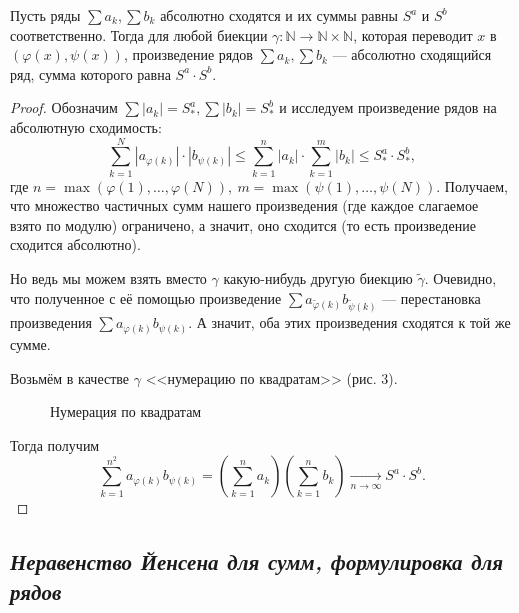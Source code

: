 \begin{theorem}
	Пусть ряды \(\sum a_k, \sum b_k\) абсолютно сходятся и их суммы равны \(S^a\) и \(S^b\) соответственно. Тогда для любой биекции \(\gamma \colon \mathbb{N} \to \mathbb{N} \times \mathbb{N}\), которая переводит \(x\) в \((\varphi(x), \psi(x))\), произведение рядов \(\sum a_k, \sum b_k\) --- абсолютно сходящийся ряд, сумма которого равна \(S^a \cdot S^b\).
\end{theorem}
\begin{proof}
	Обозначим \(\sum |a_k| = S_*^a, \sum |b_k| = S_*^b\) и исследуем произведение рядов на абсолютную сходимость: \[
	\sum_{k=1}^{N} |a_{\varphi(k)}| \cdot |b_{\psi(k)}| \leqslant \sum_{k=1}^{n} |a_k| \cdot \sum_{k=1}^{m} |b_k| \leqslant S_*^a \cdot S_*^b,
	\]
	где \(n = \max(\varphi(1), \ldots, \varphi(N)), \ m = \max(\psi(1), \ldots, \psi(N))\). Получаем, что множество частичных сумм нашего произведения (где каждое слагаемое взято по модулю) ограничено, а значит, оно сходится (то есть произведение сходится абсолютно).
	
	Но ведь мы можем взять вместо \(\gamma\) какую-нибудь другую биекцию \(\widetilde{\gamma}\). Очевидно, что полученное с её помощью произведение \(\sum a_{\widetilde{\varphi}(k)} b_{\widetilde{\psi}(k)}\) --- перестановка произведения \(\sum a_{\varphi(k)} b_{\psi(k)}\). А значит, оба этих произведения сходятся к той же сумме.
	
	Возьмём в качестве \(\gamma\) <<нумерацию по квадратам>> (рис. 3).
	
	\begin{figure}[h!]
		\label{qnum}
		\caption{Нумерация по квадратам}
	\end{figure}
	
	Тогда получим \[
	\sum_{k=1}^{n^2} a_{\varphi(k)} b_{\psi(k)} = \left(\sum_{k=1}^n a_k \right) \left(\sum_{k=1}^n b_k \right) \xrightarrow[n \to \infty]{} S^a \cdot S^b.
	\]
\end{proof}

\subsection{\itshape Неравенство Йенсена для сумм, формулировка для рядов}

